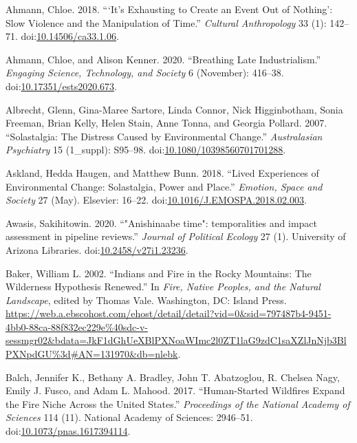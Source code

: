 \documentclass[
]{article}
\newlength{\cslhangindent}
\newenvironment{CSLReferences}[2] %
 {\begin{list}{}{%
  \setlength{\itemindent}{0pt}
  \setlength{\leftmargin}{0pt}
  \setlength{\parsep}{0pt}
  \ifodd #1
   \setlength{\leftmargin}{\cslhangindent}
   \setlength{\itemindent}{-1\cslhangindent}
  \fi
  \setlength{\itemsep}{#2\baselineskip}}}
 {\end{list}}
\begin{document}
\begin{CSLReferences}{1}{0}
Ahmann, Chloe. 2018. {``{`{It}'s Exhausting to Create an Event Out of Nothing'}: {Slow Violence} and the {Manipulation} of {Time}.''} \emph{Cultural Anthropology} 33 (1): 142--71. doi:\href{https://doi.org/10.14506/ca33.1.06}{10.14506/ca33.1.06}.

Ahmann, Chloe, and Alison Kenner. 2020. {``Breathing {Late Industrialism}.''} \emph{Engaging Science, Technology, and Society} 6 (November): 416--38. doi:\href{https://doi.org/10.17351/ests2020.673}{10.17351/ests2020.673}.

Albrecht, Glenn, Gina-Maree Sartore, Linda Connor, Nick Higginbotham, Sonia Freeman, Brian Kelly, Helen Stain, Anne Tonna, and Georgia Pollard. 2007. {``Solastalgia: {The Distress Caused} by {Environmental Change}.''} \emph{Australasian Psychiatry} 15 (1\_suppl): S95--98. doi:\href{https://doi.org/10.1080/10398560701701288}{10.1080/10398560701701288}.

Askland, Hedda Haugen, and Matthew Bunn. 2018. {``Lived Experiences of Environmental Change: {Solastalgia}, Power and Place.''} \emph{Emotion, Space and Society} 27 (May). Elsevier: 16--22. doi:\href{https://doi.org/10.1016/J.EMOSPA.2018.02.003}{10.1016/J.EMOSPA.2018.02.003}.

Awasis, Sakihitowin. 2020. {``{"Anishinaabe time": temporalities and impact assessment in pipeline reviews}.''} \emph{Journal of Political Ecology} 27 (1). University of Arizona Libraries. doi:\href{https://doi.org/10.2458/v27i1.23236}{10.2458/v27i1.23236}.

Baker, William L. 2002. {``Indians and {Fire} in the {Rocky Mountains}: {The Wilderness Hypothesis Renewed}.''} In \emph{Fire, {Native Peoples}, and the {Natural Landscape}}, edited by Thomas Vale. Washington, DC: Island Press. \url{https://web.a.ebscohost.com/ehost/detail/detail?vid=0&sid=797487b4-9451-4bb0-88ca-88f832ec229e\%40sdc-v-sessmgr02&bdata=JkF1dGhUeXBlPXNoaWImc2l0ZT1laG9zdC1saXZlJnNjb3BlPXNpdGU\%3d\#AN=131970&db=nlebk}.

Balch, Jennifer K., Bethany A. Bradley, John T. Abatzoglou, R. Chelsea Nagy, Emily J. Fusco, and Adam L. Mahood. 2017. {``Human-Started Wildfires Expand the Fire Niche Across the {United States}.''} \emph{Proceedings of the National Academy of Sciences} 114 (11). National Academy of Sciences: 2946--51. doi:\href{https://doi.org/10.1073/pnas.1617394114}{10.1073/pnas.1617394114}.


\end{CSLReferences}
\end{document}
